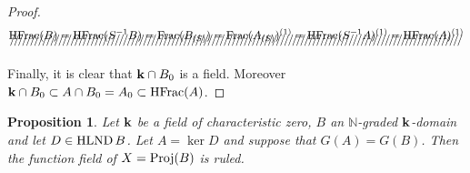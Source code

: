 \documentclass[12pt]{amsart}
\theoremstyle{plain}
\newtheorem{proposition}[subsection]{Proposition}
\theoremstyle{definition}
\newcommand{\Proj}{		\operatorname{{\rm Proj}}}
\newcommand{\Frac}{		\operatorname{{\rm Frac}}}
\newcommand{\HFrac}{		\operatorname{{\rm HFrac}}}
\newcommand{\Nat}{\ensuremath{\mathbb{N}}}
\newcommand{\bk}{{\ensuremath{\rm \bf k}}}
\newcommand{\hlnd}{\operatorname{{\rm HLND}}}
\begin{document}
\begin{proof}

$$\xout{\HFrac(B) = \HFrac(S^{-1}B) = \Frac(B_{(S)}) = \Frac(A_{(S)})^{(1)} = \HFrac(S^{-1}A)^{(1)} = \HFrac(A)^{(1)}}$$

Finally, it is clear that $\bk \cap B_0$ is a field. Moreover $\bk \cap B_0 \subset A \cap B_0 = A_0 \subset \HFrac(A)$. 


\end{proof}

\begin{proposition} \label{mainResult} Let $\bk$ be a field of characteristic zero, $B$ an $\Nat$-graded $\bk$-domain and let $D \in \hlnd B$. Let $A = \ker D$ and suppose that $G(A) = G(B)$. Then the function field of $X = \Proj(B)$ is ruled.
\end{proposition}
\end{document}
